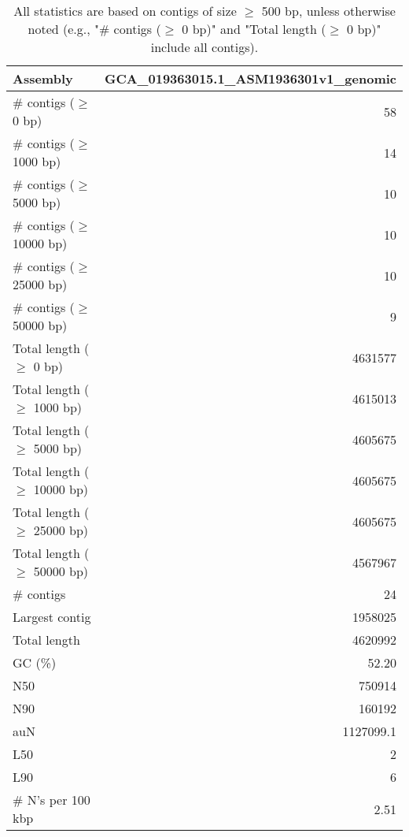 \documentclass[12pt,a4paper]{article}
\begin{document}
\begin{table}[ht]
\begin{center}
\caption{All statistics are based on contigs of size $\geq$ 500 bp, unless otherwise noted (e.g., "\# contigs ($\geq$ 0 bp)" and "Total length ($\geq$ 0 bp)" include all contigs).}
\begin{tabular}{|l*{1}{|r}|}
\hline
Assembly & GCA\_019363015.1\_ASM1936301v1\_genomic \\ \hline
\# contigs ($\geq$ 0 bp) & 58 \\ \hline
\# contigs ($\geq$ 1000 bp) & 14 \\ \hline
\# contigs ($\geq$ 5000 bp) & 10 \\ \hline
\# contigs ($\geq$ 10000 bp) & 10 \\ \hline
\# contigs ($\geq$ 25000 bp) & 10 \\ \hline
\# contigs ($\geq$ 50000 bp) & 9 \\ \hline
Total length ($\geq$ 0 bp) & 4631577 \\ \hline
Total length ($\geq$ 1000 bp) & 4615013 \\ \hline
Total length ($\geq$ 5000 bp) & 4605675 \\ \hline
Total length ($\geq$ 10000 bp) & 4605675 \\ \hline
Total length ($\geq$ 25000 bp) & 4605675 \\ \hline
Total length ($\geq$ 50000 bp) & 4567967 \\ \hline
\# contigs & 24 \\ \hline
Largest contig & 1958025 \\ \hline
Total length & 4620992 \\ \hline
GC (\%) & 52.20 \\ \hline
N50 & 750914 \\ \hline
N90 & 160192 \\ \hline
auN & 1127099.1 \\ \hline
L50 & 2 \\ \hline
L90 & 6 \\ \hline
\# N's per 100 kbp & 2.51 \\ \hline
\end{tabular}
\end{center}
\end{table}
\end{document}
